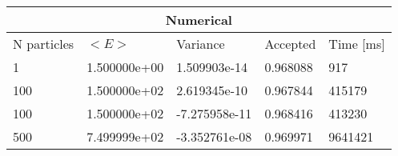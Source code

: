 \begin{tabular}{|l|l|l|l|l|}
\hline 
\multicolumn{5}{|c|}{Numerical}\\ 
\hline 
N particles & $<E>$ & Variance & Accepted & Time [ms]\\ 
 \hline 
1 & 1.500000e+00 & 1.509903e-14 & 0.968088 & 917 \\ 
\hline100 & 1.500000e+02 & 2.619345e-10 & 0.967844 & 415179 \\ 
\hline100 & 1.500000e+02 & -7.275958e-11 & 0.968416 & 413230 \\ 
\hline500 & 7.499999e+02 & -3.352761e-08 & 0.969971 & 9641421 \\ 
\hline\end{tabular}